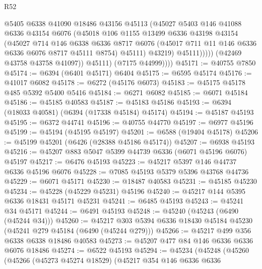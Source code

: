 \begin{lexlean}{R52}
\begin{coremodule}
                      @5405
                      @6338
                      @41090
                      @18486
                      @43156
                      @45113
                      (@45027
                        @5403
                        @146
                        @41088
                        @6336
                        @43154
                        @6076
                        (@45018
                          @106
                          @1155
                          @13499
                          @6336
                          @43198
                          @43154
                          (@45027
                            @714
                            @146
                            @6338
                            @6336
                            @8717
                            @6076
                            (@45017 @711 @11 @146 @6336 @6336 @6076 @8717 @45111 @8754)
                            @45111)
                          @43219)
                        @45111)))))
              (@42469 @43758 @43758 @41097))
            @45111)
          (@7175 @44999))))
@45171 := @40755 @7850
@45174 := @6394 (@6401 @45171) @6404
@45175 := @6595 @45174
@45176 := @41017 @6082
@45178 := @6272 (@45176 @6073)
@45183 := @45175 @45178 @485 @5392 @5400 @5416
@45184 := @6271 @6082
@45185 := @6071 @45184
@45186 := @45185 @40583
@45187 := @45183 @45186
@45193 := @6394 (@18033 @40581) (@6394 (@17338 @45184) @45174)
@45194 := @45187 @45193
@45195 := @6372 @44741
@45196 := @40755 @44770
@45197 := @6977 @45196
@45199 := @45194 (@45195 @45197)
@45201 := @6588 (@19404 @45178)
@45206 := @45199 @45201 (@6426 (@28388 @45186 @45174))
@45207 := @6938 @45193
@45216 := @45207 @883 @5047 @5399 @44739 @6336 (@6071 @45196 @6076) @45197
@45217 := @6476 @45193
@45223 := @45217 @5397 @146 @44737 @6336 @45196 @6076
@45228 := @7085 @45193 @5379 @5396 @43768 @44736
@45229 := @6071 @45171
@45230 := @18487 @40583
@45231 := @45185 @45230
@45234 := @45228 (@45229 @45231) @45196
@45240 := @45217 @144 @5395 @6336 @18431 @45171 @45231
@45241 := @6485 @45193
@45243 := @45241 @34 @45171
@45244 := @6491 @45193
@45248 := @45240 (@45243 (@6490 (@45244 @34)))
@45260 := @45217 @303 @5394 @6336 @18430 @45184 @45230 (@45241 @279 @45184 (@6490 (@45244 @279)))
@45266 := @45217 @499 @356 @6338 @6338 @18486 @40583
@45273 := @45207 @477 @84 @146 @6336 @6336 @6076 @18486
@45274 := @6522 @45193
@45294 := @45234
    (@45248
      (@45260
        (@45266
          (@45273 @45274 @18529)
          (@45217
            @354
            @146
            @6336
            @6336

\end{coremodule}
\end{lexlean}
